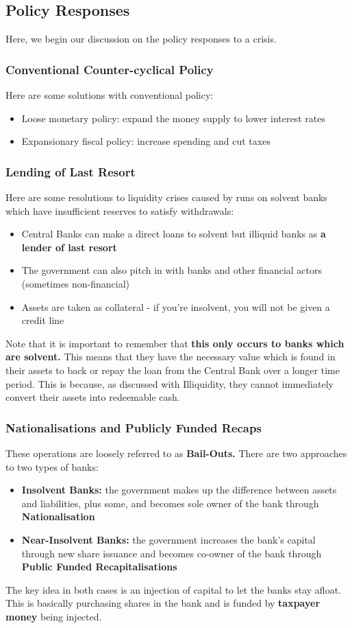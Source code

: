 \documentclass[12pt, letterpaper]{article}
\begin{document}
\subsection{Policy Responses}
Here, we begin our discussion on the policy responses to a crisis.
\subsubsection{Conventional Counter-cyclical Policy}
Here are some solutions with conventional policy:
\begin{itemize}
	\item Loose monetary policy: expand the money supply to lower interest rates
	\item Expansionary fiscal policy: increase spending and cut taxes
\end{itemize}

\subsubsection{Lending of Last Resort}
Here are some resolutions to liquidity crises caused by runs on solvent banks which have insufficient reserves to satisfy withdrawals:
\begin{itemize}
	\item Central Banks can make a direct loans to solvent but illiquid banks as \textbf{a lender of last resort}
	\item The government can also pitch in with banks and other financial actors (sometimes non-financial)
	\item Assets are taken as collateral - if you're insolvent, you will not be given a credit line 
\end{itemize}
Note that it is important to remember that \textbf{this only occurs to banks which are solvent.} This means that they have the necessary value which is found in their assets to back or repay the loan from the Central Bank over a longer time period. This is because, as discussed with Illiquidity, they cannot immediately convert their assets into redeemable cash.


\subsubsection{Nationalisations and Publicly Funded Recaps}
These operations are loosely referred to as \textbf{Bail-Outs.} There are two approaches to two types of banks:
\begin{itemize}
	\item \textbf{Insolvent Banks:} the government makes up the difference between assets and liabilities, plus some, and becomes sole owner of the bank through \textbf{Nationalisation}
	\item \textbf{Near-Insolvent Banks:} the government increases the bank's capital through new share issuance and becomes co-owner of the bank through \textbf{Public Funded Recapitalisations}
\end{itemize}
The key idea in both cases is an injection of capital to let the banks stay afloat. This is basically purchasing shares in the bank and is funded by \textbf{taxpayer money} being injected.
\end{document}
